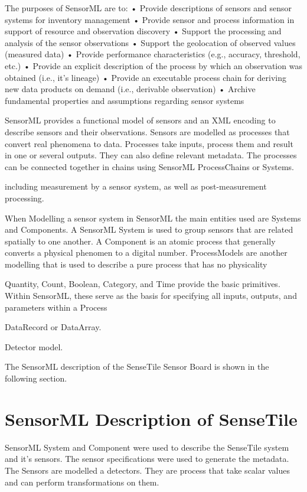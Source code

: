 \documentclass[]{final_report}
\begin{document}
The purposes of SensorML are to:
• Provide descriptions of sensors and sensor systems for inventory management
• Provide sensor and process information in support of resource and observation discovery
• Support the processing and analysis of the sensor observations
• Support the geolocation of observed values (measured data)
• Provide performance characteristics (e.g., accuracy, threshold, etc.)
• Provide an explicit description of the process by which an observation was obtained (i.e., it’s lineage)
• Provide an executable process chain for deriving new data products on demand (i.e., derivable observation)
• Archive fundamental properties and assumptions regarding sensor systems

SensorML provides a functional model of sensors and an XML encoding to describe sensors and their observations.
Sensors are modelled as processes that convert real phenomena to data. Processes take inputs, process them and result in one or several outputs. They can also define relevant metadata. The processes can be connected together in chains using SensorML ProcessChains or Systems. 

including measurement by a sensor system, as well as post-measurement
processing.

When Modelling a sensor system in SensorML the main entities used are Systems and Components. A SensorML System is used to group sensors that are related spatially to one another.  A Component is an atomic process that generally converts a physical phenomen to a digital number. ProcessModels are another modelling that is used to describe a pure process that has no physicality

Quantity, Count, Boolean, Category, and Time provide the basic primitives. Within SensorML, these serve as the basis for specifying all inputs, outputs, and parameters within a Process

DataRecord or DataArray.

Detector model.

The SensorML description of the SenseTile Sensor Board is shown in the following section.

\section{SensorML Description of SenseTile}

SensorML System and Component were used to describe the SenseTile system and it's sensors. The sensor specifications were used to generate the metadata.
The Sensors are modelled a detectors. They are process that take scalar values
and can perform transformations on them.
\end{document}
